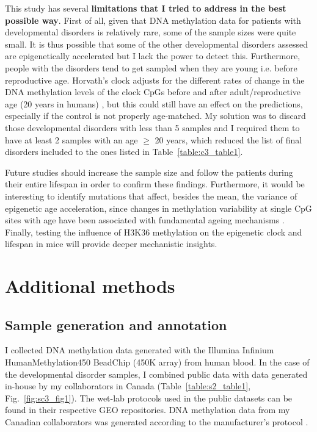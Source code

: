 \bigskip

This study has several \textbf{limitations that I tried to address in the best possible way}. First of all, given that DNA methylation data for patients with developmental disorders is relatively rare, some of the sample sizes were quite small. It is thus possible that some of the other developmental disorders assessed are epigenetically accelerated but I lack the power to detect this. Furthermore, people with the disorders tend to get sampled when they are young i.e. before reproductive age. Horvath's clock adjusts for the different rates of change in the DNA methylation levels of the clock CpGs before and after adult/reproductive age (20 years in humans) \cite{Horvath2013}, but this could still have an effect on the predictions, especially if the control is not properly age-matched. My solution was to discard those developmental disorders with less than 5 samples and I required them to have at least 2 samples with an age $\geq$ 20 years, which reduced the list of final disorders included to the ones listed in Table~\ref{table:c3_table1}. 

\bigskip

Future studies should increase the sample size and follow the patients during their entire lifespan in order to confirm these findings. Furthermore, it would be interesting to identify mutations that affect, besides the mean, the variance of epigenetic age acceleration, since changes in methylation variability at single CpG sites with age have been associated with fundamental ageing mechanisms \cite{Slieker2016}. Finally, testing the influence of H3K36 methylation on the epigenetic clock and lifespan in mice will provide deeper mechanistic insights.

\smallskip

\section{Additional methods} \label{s:3.7}

\subsection*{Sample generation and annotation}

I collected DNA methylation data generated with the Illumina Infinium HumanMethylation450 BeadChip (450K array) from human blood. In the case of the developmental disorder samples, I combined public data with data generated in-house by my collaborators in Canada (Table~\ref{table:s2_table1}, Fig.~\ref{fig:sc3_fig1}). The wet-lab protocols used in the public datasets can be found in their respective GEO repositories. DNA methylation data from my Canadian collaborators was generated according to the manufacturer's protocol \cite{Research,Illumina2015}.

